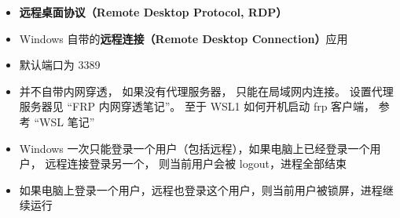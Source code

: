 
\begin{issues}
\issueDraft
\end{issues}

\begin{itemize}
\item \textbf{远程桌面协议（Remote Desktop Protocol, RDP）}
\item Windows 自带的\textbf{远程连接（Remote Desktop Connection）}应用
\item 默认端口为 3389
\item 并不自带内网穿透， 如果没有代理服务器， 只能在局域网内连接。 设置代理服务器见 “FRP 内网穿透笔记”。 至于 WSL1 如何开机启动 frp 客户端， 参考 “WSL 笔记”
\item Windows 一次只能登录一个用户（包括远程），如果电脑上已经登录一个用户， 远程连接登录另一个， 则当前用户会被 logout，进程全部结束
\item 如果电脑上登录一个用户，远程也登录这个用户，则当前用户被锁屏，进程继续运行
\end{itemize}
